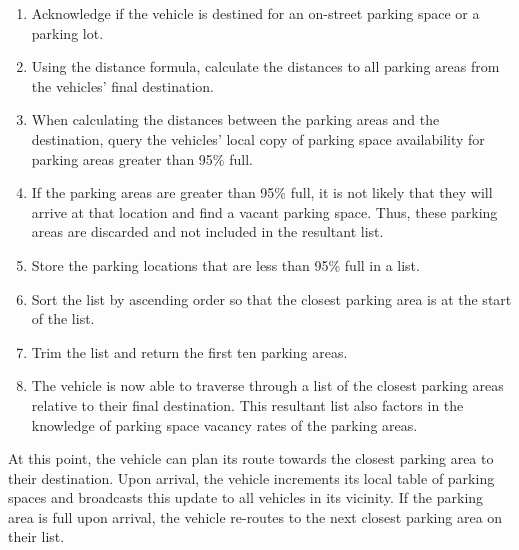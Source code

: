 \begin{enumerate}
    \item Acknowledge if the vehicle is destined for an on-street parking space or a parking lot.
    \item Using the distance formula, calculate the distances to all parking areas from the vehicles' final destination.
    \item When calculating the distances between the parking areas and the destination, query the vehicles' local copy of parking space availability for parking areas greater than 95\% full.
    \item If the parking areas are greater than 95\% full, it is not likely that they will arrive at that location and find a vacant parking space. Thus, these parking areas are discarded and not included in the resultant list.
    \item Store the parking locations that are less than 95\% full in a list.
    \item Sort the list by ascending order so that the closest parking area is at the start of the list.
    \item Trim the list and return the first ten parking areas.
    \item The vehicle is now able to traverse through a list of the closest parking areas relative to their final destination. This resultant list also factors in the knowledge of parking space vacancy rates of the parking areas.
\end{enumerate}

At this point, the vehicle can plan its route towards the closest parking area to their destination. Upon arrival, the vehicle increments its local table of parking spaces and broadcasts this update to all vehicles in its vicinity. If the parking area is full upon arrival, the vehicle re-routes to the next closest parking area on their list.

